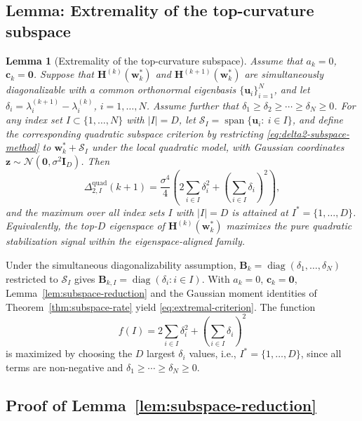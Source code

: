 \documentclass{article}
\newtheorem{lemma}[theorem]{Lemma}
\begin{document}
\subsection{Lemma: Extremality of the top-curvature subspace}
\label{app:extremal}

\begin{lemma}[Extremality of the top-curvature subspace]
\label{lemma:extremal-topD}
Assume that $a_k=0$, $\mathbf c_k=\mathbf 0$.
Suppose that $\mathbf H^{(k)}(\mathbf w_k^*)$ and $\mathbf H^{(k+1)}(\mathbf w_k^*)$ are simultaneously diagonalizable with a common orthonormal eigenbasis $\{\mathbf u_i\}_{i=1}^N$, and let $\delta_i=\lambda_i^{(k+1)}-\lambda_i^{(k)}$, $i=1,\dots,N$.
Assume further that $\delta_1 \ge \delta_2 \ge \cdots \ge \delta_N \ge 0$.
For any index set $I\subset\{1,\dots,N\}$ with $|I|=D$, let $\mathcal S_I=\operatorname{span}\{\mathbf u_i:\ i\in I\}$, and define the corresponding quadratic subspace criterion by restricting \eqref{eq:delta2-subspace-method} to $\mathbf w_k^*+\mathcal S_I$ under the local quadratic model, with Gaussian coordinates $\mathbf z\sim\mathcal N(\mathbf 0,\sigma^2\mathbf I_D)$.
Then
\begin{equation}
\label{eq:extremal-criterion}
\Delta_{2,I}^{\mathrm{quad}}(k+1)
=
\frac{\sigma^4}{4}
\left(
2\sum_{i\in I}\delta_i^2
+
\left(\sum_{i\in I}\delta_i\right)^2
\right),
\end{equation}
and the maximum over all index sets $I$ with $|I|=D$ is attained at $I^*=\{1,\dots,D\}$.
Equivalently, the top-$D$ eigenspace of $\mathbf H^{(k)}(\mathbf w_k^*)$ maximizes the pure quadratic stabilization signal within the eigenspace-aligned family.
\end{lemma}

Under the simultaneous diagonalizability assumption, $\mathbf B_k = \operatorname{diag}(\delta_1,\dots,\delta_N)$ restricted to $\mathcal S_I$ gives $\mathbf B_{k,I}=\operatorname{diag}(\delta_i : i\in I)$.
With $a_k=0$, $\mathbf c_k=\mathbf 0$, Lemma~\ref{lem:subspace-reduction} and the Gaussian moment identities of Theorem~\ref{thm:subspace-rate} yield \eqref{eq:extremal-criterion}.
The function
\[
f(I)=2\sum_{i\in I}\delta_i^2+\left(\sum_{i\in I}\delta_i\right)^2
\]
is maximized by choosing the $D$ largest $\delta_i$ values, i.e., $I^*=\{1,\dots,D\}$, since all terms are non-negative and $\delta_1\ge\cdots\ge\delta_N\ge 0$.

\subsection{Proof of Lemma~\ref{lem:subspace-reduction}}
\end{document}

